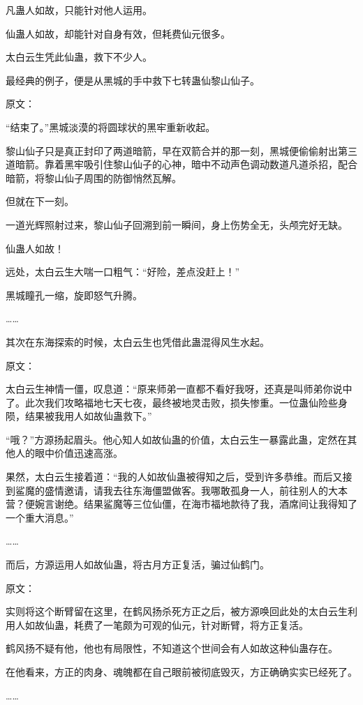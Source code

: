 \begin{this_body}
凡蛊人如故，只能针对他人运用。

仙蛊人如故，却能针对自身有效，但耗费仙元很多。

太白云生凭此仙蛊，救下不少人。

最经典的例子，便是从黑城的手中救下七转蛊仙黎山仙子。

原文：

“结束了。”黑城淡漠的将圆球状的黑牢重新收起。

黎山仙子只是真正封印了两道暗箭，早在双箭合并的那一刻，黑城便偷偷射出第三道暗箭。靠着黑牢吸引住黎山仙子的心神，暗中不动声色调动数道凡道杀招，配合暗箭，将黎山仙子周围的防御悄然瓦解。

但就在下一刻。

一道光辉照射过来，黎山仙子回溯到前一瞬间，身上伤势全无，头颅完好无缺。

仙蛊人如故！

远处，太白云生大喘一口粗气：“好险，差点没赶上！”

黑城瞳孔一缩，旋即怒气升腾。

……

其次在东海探索的时候，太白云生也凭借此蛊混得风生水起。

原文：

太白云生神情一僵，叹息道：“原来师弟一直都不看好我呀，还真是叫师弟你说中了。此次我们攻略福地七天七夜，最终被地灵击败，损失惨重。一位蛊仙险些身陨，结果被我用人如故仙蛊救下。”

“哦？”方源扬起眉头。他心知人如故仙蛊的价值，太白云生一暴露此蛊，定然在其他人的眼中价值迅速高涨。

果然，太白云生接着道：“我的人如故仙蛊被得知之后，受到许多恭维。而后又接到鲨魔的盛情邀请，请我去往东海僵盟做客。我哪敢孤身一人，前往别人的大本营？便婉言谢绝。结果鲨魔等三位仙僵，在海市福地款待了我，酒席间让我得知了一个重大消息。”

……

而后，方源运用人如故仙蛊，将古月方正复活，骗过仙鹤门。

原文：

实则将这个断臂留在这里，在鹤风扬杀死方正之后，被方源唤回此处的太白云生利用人如故仙蛊，耗费了一笔颇为可观的仙元，针对断臂，将方正复活。

鹤风扬不疑有他，他也有局限性，不知道这个世间会有人如故这种仙蛊存在。

在他看来，方正的肉身、魂魄都在自己眼前被彻底毁灭，方正确确实实已经死了。

……


\end{this_body}
